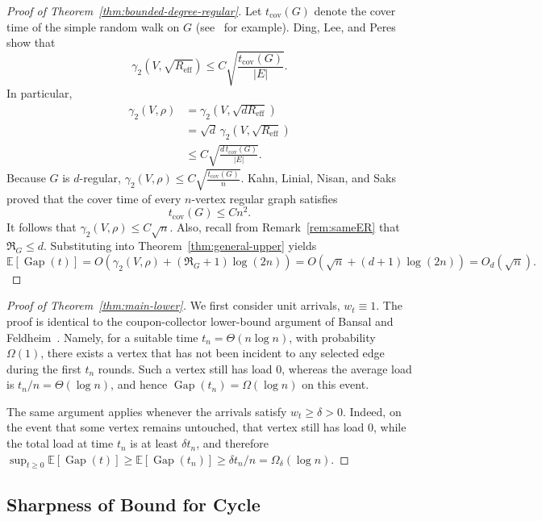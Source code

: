 \documentclass[11pt]{article}
\numberwithin{equation}{section}
\newcommand{\E}{\mathbb{E}}
\newcommand{\1}{\mathbf{1}}
\newcommand{\Gap}{\operatorname{Gap}}
\begin{document}
\begin{proof}[Proof of Theorem~\ref{thm:bounded-degree-regular}]
Let \(t_{\mathrm{cov}}(G)\) denote the cover time of the simple random walk on \(G\) (see~\cite{LevinPeres} for example). Ding, Lee, and Peres~\cite[Theorem~1.2]{DingLeePeres} show that
\[
\gamma_2
\left(
V,\sqrt{R_{\mathrm{eff}}}
\right)
\le
C
\sqrt{
\frac{t_{\mathrm{cov}}(G)}{|E|}
}.
\]
In particular,
\[
\begin{aligned}
\gamma_2(V,\rho)
&=
\gamma_2
\left(
V,\sqrt{dR_{\mathrm{eff}}}
\right)\\
&=
\sqrt d\,
\gamma_2
\left(
V,\sqrt{R_{\mathrm{eff}}}
\right)\\
&\le
C
\sqrt{
\frac{d\,t_{\mathrm{cov}}(G)}
{|E|}
}.
\end{aligned}
\]
Because \(G\) is \(d\)-regular,
\( \gamma_2(V,\rho) \le C \sqrt{
\frac{t_{\mathrm{cov}}(G)}{n}}.\)
Kahn, Linial, Nisan, and Saks~\cite{KahnLinialNisanSaks} proved that the cover time of every \(n\)-vertex regular graph satisfies
\[
t_{\mathrm{cov}}(G)
\le
Cn^2.
\]
It follows that \( \gamma_2(V,\rho) \le C\sqrt n.\)
Also, recall from Remark~\ref{rem:sameER} that \(\Re_G\le d.\)
Substituting into Theorem~\ref{thm:general-upper} yields
\[
\E[\Gap(t)]
=
O\left(
\gamma_2(V,\rho)
+
(\Re_G+1)\log(2n)
\right)
=
O\left(
\sqrt n
+
(d+1)\log(2n)
\right)
=
O_d(\sqrt n).
\]
\end{proof}

\medskip

\begin{proof}[Proof of Theorem~\ref{thm:main-lower}]
We first consider unit arrivals, \(w_t\equiv1\). The proof is identical to the  coupon-collector lower-bound argument of Bansal and Feldheim~\cite{BansalFeldheim}. Namely, for a suitable time \(t_n=\Theta(n\log n)\), with probability $\Omega(1)$, there exists a vertex that has not been incident to any selected edge during the first \(t_n\) rounds. Such a vertex still has load \(0\), whereas the average load is \(t_n/n=\Theta(\log n)\), and hence \(\Gap(t_n)=\Omega(\log n)\) on this event.

The same argument applies whenever the arrivals satisfy \(w_t\ge\delta>0\). Indeed, on the event that some vertex remains untouched, that vertex still has load \(0\), while the total load at time \(t_n\) is at least \(\delta t_n\), and therefore
\(
\sup_{t\ge0}\E[\Gap(t)]\ge \E[\Gap(t_n)] \ge\delta t_n/n=\Omega_\delta(\log n).
\)
\end{proof}


\subsection{Sharpness of Bound for Cycle}\label{sec:LBoundCycle}
\end{document}

